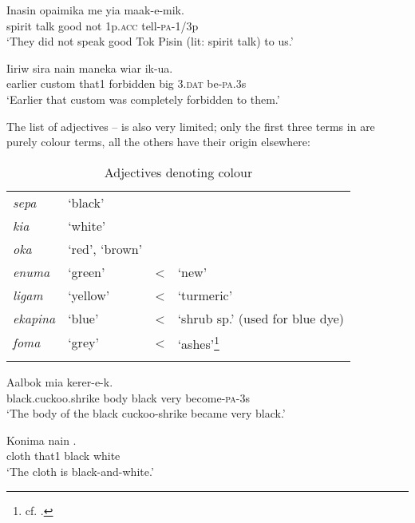 \ea%
\label{ex:3:x1760}
\gll Inasin opaimika  me yia maak-e-mik. \\
spirit talk good not 1p.\textsc{acc} tell-\textsc{pa}-1/3p\\
\glt`They did not speak good Tok Pisin (lit: spirit talk) to us.'
\z

\ea%
\label{ex:3:x1759}
\gll Iiriw sira nain  maneka wiar ik-ua. \\
earlier custom that1 forbidden big 3.\textsc{dat} be-\textsc{pa}.3s\\
\glt`Earlier that custom was completely forbidden to them.'
\z

The list of  adjectives -- is also very limited; only the first three terms in  are purely colour terms, all the others have their origin elsewhere:

\begin{table}
\caption{Adjectives denoting colour}
\label{tab:3:colouradj}
 
\begin{tabular}{>{\itshape}llcl}
\mytoprule
sepa &`black'&&\\
kia &`white'&&\\
oka &`red', `brown'&&\\
enuma &`green' &{\textless} &`new'\\
ligam &`yellow' &{\textless} &`turmeric'\\
ekapina &`blue' &{\textless} &`shrub sp.' (used for blue dye)\\
foma &`grey' &{\textless} &`ashes'\footnote{cf. \cite[4]{BerlinEtAl1969}.}\\
\mybottomrule
\end{tabular}

\end{table}

\ea%
\label{ex:3:x1753}
\gll Aalbok mia    kerer-e-k. \\
black.cuckoo.shrike body black very become-\textsc{pa}-3s\\
\glt`The body of the black cuckoo-shrike became very black.'
\z

\ea%
\label{ex:3:x109}
\gll Konima nain  . \\
cloth that1 black white\\
\glt`The cloth is black-and-white.'
\z

